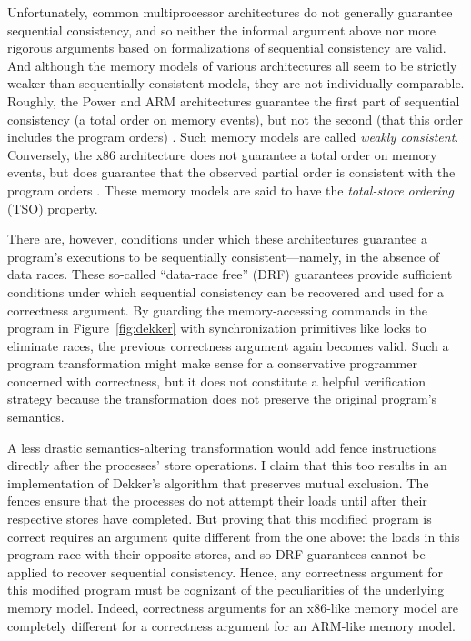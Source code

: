 \documentclass[11pt]{article}
\begin{document}
Unfortunately, common multiprocessor architectures do not generally guarantee sequential consistency, and so neither the informal argument above nor more rigorous arguments based on formalizations of sequential consistency are valid. And although the memory models of various architectures all seem to be strictly weaker than sequentially consistent models, they are not individually comparable. Roughly, the Power and ARM architectures guarantee the first part of sequential consistency (a total order on memory events), but not the second (that this order includes the program orders) \cite{DBLP:conf/popl/2009damp,DBLP:conf/asplos/ChongI08}. Such memory models are called \emph{weakly consistent}. Conversely, the x86 architecture does not guarantee a total order on memory events, but does guarantee that the observed partial order is consistent with the program orders \cite{DBLP:conf/tphol/OwensSS09}. These memory models are said to have the \emph{total-store ordering} (TSO) property.

There are, however, conditions under which these architectures guarantee a program's executions to be sequentially consistent---namely, in the absence of data races. These so-called ``data-race free'' (DRF) guarantees provide sufficient conditions under which sequential consistency can be recovered and used for a correctness argument. By guarding the memory-accessing commands in the program in Figure~\ref{fig:dekker} with synchronization primitives like locks to eliminate races, the previous correctness argument again becomes valid. Such a program transformation might make sense for a conservative programmer concerned with correctness, but it does not constitute a helpful verification strategy because the transformation does not preserve the original program's semantics.


A less drastic semantics-altering transformation would add fence instructions directly after the processes' store operations. I claim that this too results in an implementation of Dekker's algorithm that preserves mutual exclusion. The fences ensure that the processes do not attempt their loads until after their respective stores have completed. But proving that this modified program is correct requires an argument quite different from the one above: the loads in this program race with their opposite stores, and so DRF guarantees cannot be applied to recover sequential consistency. Hence, any correctness argument for this modified program must be cognizant of the peculiarities of the underlying memory model. Indeed, correctness arguments for an x86-like memory model are completely different for a correctness argument for an ARM-like memory model.
\end{document}
